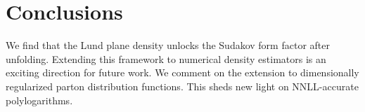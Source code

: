 \section{Conclusions}\label{sec:conclusions}

We find that the Lund plane density unlocks the Sudakov form factor
after unfolding. Extending this framework to numerical density
estimators is an exciting direction for future work. We comment on the
extension to dimensionally regularized parton distribution functions.
This sheds new light on NNLL-accurate polylogarithms.

